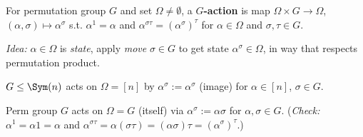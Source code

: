 \begin{slide}
    \begin{definition}
        \vspace{0pt}
        For permutation group $G$ and set $\Omega \neq \emptyset$, a \textbf{$G$-action} is map $\Omega \times G \to \Omega$, $(\alpha,\sigma) \mapsto \alpha^\sigma$ s.t. $\alpha^1 = \alpha$ and $\alpha^{\sigma\tau} = (\alpha^\sigma)^\tau$ for $\alpha \in \Omega$ and $\sigma,\tau \in G$.
    \end{definition}

    \textit{Idea:} $\alpha \in \Omega$ is \textit{state}, apply \textit{move} $\sigma \in G$ to get state $\alpha^\sigma \in \Omega$, in way that respects permutation product. \pause

    \begin{example}
        \vspace{0pt}
        $G \leq \Sym(n)$ acts on $\Omega = [n]$ by $\alpha^\sigma := \alpha^\sigma$ (image) for $\alpha \in [n]$, $\sigma \in G$.
    \end{example} \pause

    \begin{example}
        \vspace{0pt}
        Perm group $G$ acts on $\Omega = G$ (itself) via $\alpha^\sigma := \alpha\sigma$ for $\alpha,\sigma \in G$. (\textit{Check:} $\alpha^1 = \alpha 1 = \alpha$ and $\alpha^{\sigma\tau} = \alpha(\sigma\tau) = (\alpha\sigma)\tau = (\alpha^\sigma)^\tau$.)
    \end{example}
\end{slide}

